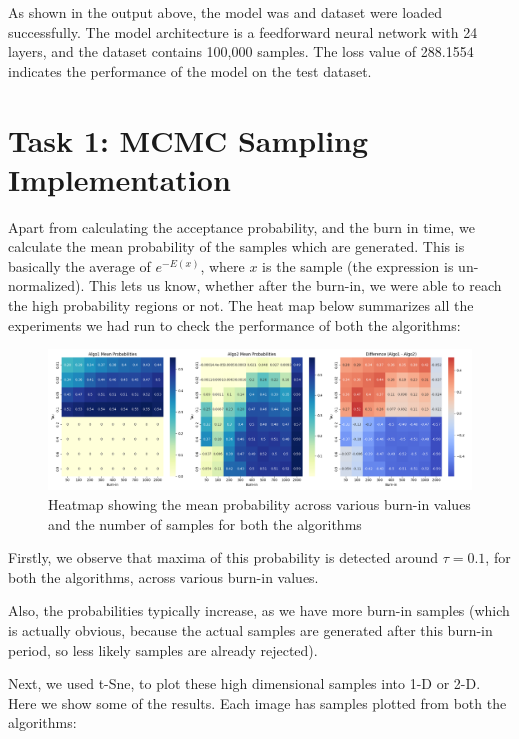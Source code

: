 \documentclass[a4paper,12pt]{article}
\begin{document}
As shown in the output above, the model was and dataset were loaded successfully. The model architecture is a feedforward neural network with 24 layers, and the dataset contains 100,000 samples. The loss value of 288.1554 indicates the performance of the model on the test dataset.

\section*{Task 1: MCMC Sampling Implementation}
Apart from calculating the acceptance probability, and the burn in time, we calculate the mean probability of the samples which are generated. This is basically the average of $e^{-E(x)}$, where $x$ is the sample (the expression is un-normalized). This lets us know, whether after the burn-in, we were able to reach the high probability regions or not.
The heat map below summarizes all the experiments we had run to check the performance of both the algorithms:
\begin{figure}[H]
  \includegraphics[width=\textwidth]{TASK-0-1/heatmap_prob.png}
  \caption{Heatmap showing the mean probability across various burn-in values and the number of samples for both the algorithms}
\end{figure}

Firstly, we observe that maxima of this probability is detected around $\tau = 0.1$, for both the algorithms, across various burn-in values.


Also, the probabilities typically increase, as we have more burn-in samples (which is actually obvious, because the actual samples are generated after this burn-in period, so less likely samples are already rejected).


Next, we used t-Sne, to plot these high dimensional samples into 1-D or 2-D. Here we show some of the results. Each image has samples plotted from both the algorithms:
\end{document}
